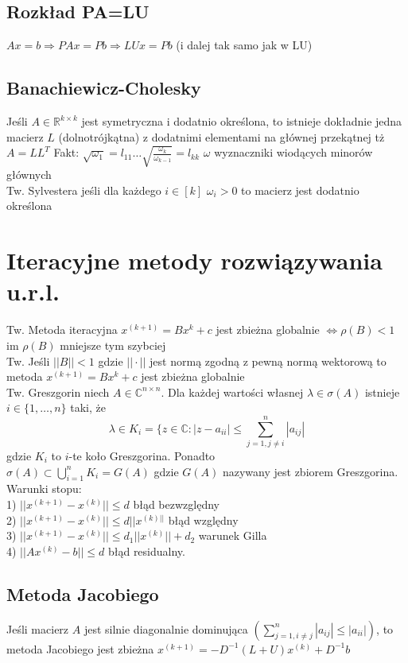 \documentclass[twocolumn]{article}
\begin{document}
\begin{flushleft}
\subsection{Rozkład PA=LU}
$Ax=b \Rightarrow PAx=Pb \Rightarrow LUx=Pb$ (i dalej tak samo jak w LU)
\subsection{Banachiewicz-Cholesky}
Jeśli $A \in \mathbb{R}^{k\times k}$ jest symetryczna i dodatnio określona, to istnieje dokładnie jedna macierz $L$ (dolnotrójkątna) z dodatnimi elementami na głównej przekątnej tż $A=LL^T$
Fakt: $\sqrt{\omega_1} = l_{11} \ldots \sqrt{\frac{\omega_{k}}{\omega_{k-1}}} = l_{kk}$  $\omega$ wyznaczniki wiodących minorów głównych\\
Tw. Sylvestera jeśli dla każdego $i \in [k]$  $\omega_i > 0$ to macierz jest dodatnio określona 

\section{Iteracyjne metody rozwiązywania u.r.l.}
Tw. Metoda iteracyjna $x^{(k+1)} = Bx^k + c$ jest zbieżna globalnie $\Leftrightarrow \rho(B) < 1$\\ im $\rho(B)$ mniejsze tym szybciej\\
Tw. Jeśli $||B|| < 1$ gdzie $||\cdot||$ jest normą zgodną z pewną normą wektorową to metoda $x^{(k+1)}=Bx^k+c$ jest zbieżna globalnie\\
Tw. Greszgorin niech $A \in \mathbb{C}^{n \times n}$. Dla każdej wartości własnej $\lambda \in \sigma(A)$ istnieje $i \in \{1,\ldots,n\}$ taki, że
$$\lambda \in K_i = \{z \in \mathbb{C}:|z-a_{ii}| \leq \sum_{j=1,j \neq i}^{n} |a_{ij}|$$
gdzie $K_i$ to $i$-te koło Greszgorina. Ponadto\\
$\sigma(A) \subset \bigcup_{i=1}^nK_i = G(A)$ gdzie $G(A)$ nazywany jest zbiorem Greszgorina.\\
Warunki stopu: \\ %
1) $||x^{(k+1)} - x^{(k)}|| \leq d$ błąd bezwzględny \\
2) $||x^{(k+1)} - x^{(k)}|| \leq d||x^{(k)||}$ błąd względny \\
3) $||x^{(k+1)} - x^{(k)}|| \leq d_1||x^{(k)}|| + d_2$ warunek Gilla\\
4) $||Ax^{(k)} -b || \leq d$ błąd residualny. \\

\subsection{Metoda Jacobiego}
Jeśli macierz $A$ jest silnie diagonalnie dominująca $\left(\sum_{j=1,i\neq j}^n |a_{ij}| \leq |a_{ii}|\right)$, to metoda Jacobiego jest zbieżna
$x^{(k+1)} = -D^{-1}(L+U)x^{(k)}+D^{-1}b$
\begin{algorithmic}
\ENDFOR
\end{algorithmic}

\end{flushleft}
\end{document}
